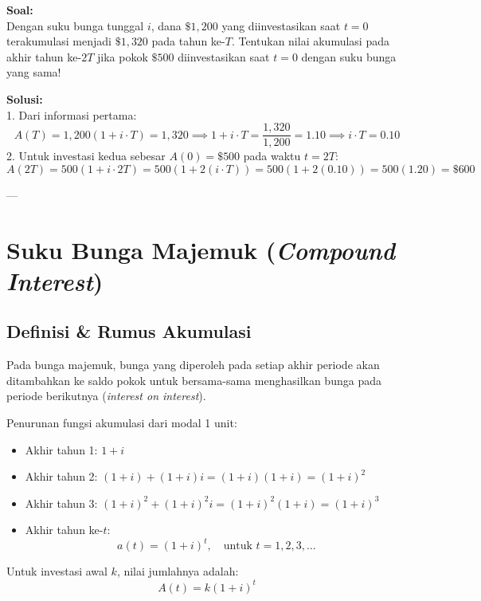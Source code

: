 \documentclass[11pt,a4paper]{article}
\begin{document}
\begin{examplebox}
\textbf{Soal:}\\
Dengan suku bunga tunggal $i$, dana $\$1{,}200$ yang diinvestasikan saat $t=0$ terakumulasi menjadi $\$1{,}320$ pada tahun ke-$T$. Tentukan nilai akumulasi pada akhir tahun ke-$2T$ jika pokok $\$500$ diinvestasikan saat $t=0$ dengan suku bunga yang sama!

\vspace{0.5em}
\textbf{Solusi:}\\
1. Dari informasi pertama:
\begin{equation*}
    A(T) = 1{,}200(1 + i \cdot T) = 1{,}320 \implies 1 + i \cdot T = \frac{1{,}320}{1{,}200} = 1.10 \implies i \cdot T = 0.10
\end{equation*}
2. Untuk investasi kedua sebesar $A(0) = \$500$ pada waktu $t = 2T$:
\begin{equation*}
    A(2T) = 500(1 + i \cdot 2T) = 500\left(1 + 2(i \cdot T)\right) = 500(1 + 2(0.10)) = 500(1.20) = \$600
\end{equation*}
\end{examplebox}

---

\section{Suku Bunga Majemuk (\textit{Compound Interest})}

\subsection{Definisi \& Rumus Akumulasi}
\begin{definitionbox}
Pada bunga majemuk, bunga yang diperoleh pada setiap akhir periode akan ditambahkan ke saldo pokok untuk bersama-sama menghasilkan bunga pada periode berikutnya (\textit{interest on interest}).
\end{definitionbox}

Penurunan fungsi akumulasi dari modal 1 unit:
\begin{itemize}
    \item Akhir tahun 1: $1 + i$
    \item Akhir tahun 2: $(1 + i) + (1 + i)i = (1 + i)(1 + i) = (1 + i)^2$
    \item Akhir tahun 3: $(1 + i)^2 + (1 + i)^2 i = (1 + i)^2(1 + i) = (1 + i)^3$
    \item Akhir tahun ke-$t$:
    \begin{equation}
        a(t) = (1 + i)^t, \quad \text{untuk } t = 1, 2, 3, \dots
    \end{equation}
\end{itemize}
Untuk investasi awal $k$, nilai jumlahnya adalah:
\begin{equation}
    A(t) = k(1 + i)^t
\end{equation}
\end{document}
